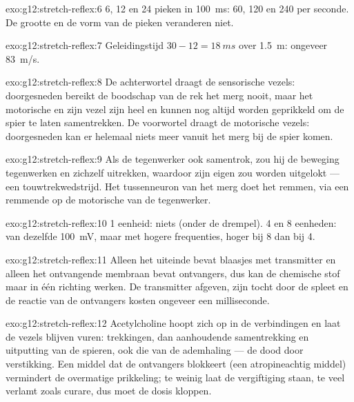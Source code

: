 \begin{solution}{exo:g12:stretch-reflex:6}
6, 12 en 24 pieken in \qty{100}{ms}: 60, 120 en 240 per seconde. De
grootte en de vorm van de pieken veranderen niet.
\end{solution}

\begin{solution}{exo:g12:stretch-reflex:7}
Geleidingstijd $30 - 12 = \qty{18}{ms}$ over \qty{1.5}{m}: ongeveer
\qty{83}{m/s}.
\end{solution}

\begin{solution}{exo:g12:stretch-reflex:8}
De achterwortel draagt de sensorische vezels: doorgesneden bereikt de
boodschap van de rek het merg nooit, maar het motorische  en zijn
vezel zijn heel en kunnen nog altijd worden geprikkeld om de spier te
laten samentrekken. De voorwortel draagt de motorische vezels:
doorgesneden kan er helemaal niets meer vanuit het merg bij de spier
komen.
\end{solution}

\begin{solution}{exo:g12:stretch-reflex:9}
Als de tegenwerker ook samentrok, zou hij de beweging tegenwerken en
zichzelf uitrekken, waardoor zijn eigen  zou worden uitgelokt --- een
touwtrekwedstrijd. Het tussenneuron van het merg doet het remmen, via een
remmende  op de motorische  van de tegenwerker.
\end{solution}

\begin{solution}{exo:g12:stretch-reflex:10}
1 eenheid: niets (onder de drempel). 4 en 8 eenheden:  van
dezelfde \qty{100}{mV}, maar met hogere frequenties, hoger bij 8 dan bij 4.
\end{solution}

\begin{solution}{exo:g12:stretch-reflex:11}
Alleen het uiteinde bevat blaasjes met transmitter en alleen het
ontvangende membraan bevat ontvangers, dus kan de chemische stof maar in
één richting werken. De transmitter afgeven, zijn tocht door de spleet en
de reactie van de ontvangers kosten ongeveer een milliseconde.
\end{solution}

\begin{solution}{exo:g12:stretch-reflex:12}
Acetylcholine hoopt zich op in de verbindingen en laat de vezels blijven
vuren: trekkingen, dan aanhoudende samentrekking en uitputting van de
spieren, ook die van de ademhaling --- de dood door verstikking. Een
middel dat de ontvangers blokkeert (een atropineachtig middel) vermindert
de overmatige prikkeling; te weinig laat de vergiftiging staan, te veel
verlamt zoals curare, dus moet de dosis kloppen.
\end{solution}

